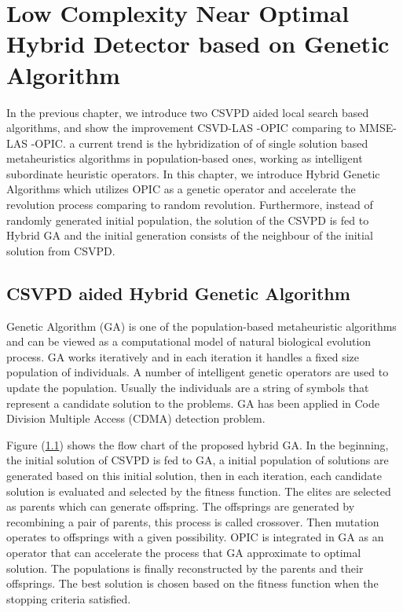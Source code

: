 \resetdatestamp

\chapter{Low Complexity Near Optimal Hybrid Detector based on Genetic Algorithm}\label{Chapter GA}
In the previous chapter, we introduce two CSVPD aided local search based algorithms, and show the improvement CSVD-LAS -OPIC comparing to MMSE-LAS -OPIC.    
a current trend is the hybridization of of single solution based metaheuristics algorithms in population-based ones, working as intelligent subordinate heuristic operators. In this chapter, we introduce Hybrid Genetic Algorithms which utilizes OPIC as a genetic operator and accelerate the revolution process comparing to random revolution. Furthermore, instead of randomly generated initial population, the solution of the CSVPD is fed to Hybrid GA and the initial generation consists of the neighbour of the initial solution from CSVPD.  
\section{CSVPD aided Hybrid Genetic Algorithm}
Genetic Algorithm (GA) is one of the population-based metaheuristic algorithms and can be viewed as a computational model of natural biological evolution process. GA works iteratively and in each iteration it handles a fixed size population of individuals. A number of intelligent genetic operators are used to update the population. Usually the individuals are a string of symbols that represent a candidate solution to the problems. GA has been applied in Code Division Multiple Access (CDMA) detection problem\cite{juntti1997genetic}\cite{ergun2000multiuser}.  

Figure (\ref{}) shows the flow chart of the proposed hybrid GA. In the beginning, the initial solution of CSVPD is fed to GA, a initial population of solutions are generated based on this initial solution, then in each iteration, each candidate solution is evaluated and selected by the fitness function. The elites are selected as parents which can generate offspring. The offsprings are generated by recombining a pair of parents, this process is called crossover. Then mutation operates to offsprings with a given possibility. OPIC is integrated in GA as an operator that can accelerate the process that GA approximate to optimal solution. The populations is finally reconstructed by the parents and their offsprings. The best solution is chosen based on the fitness function when the stopping criteria satisfied.

